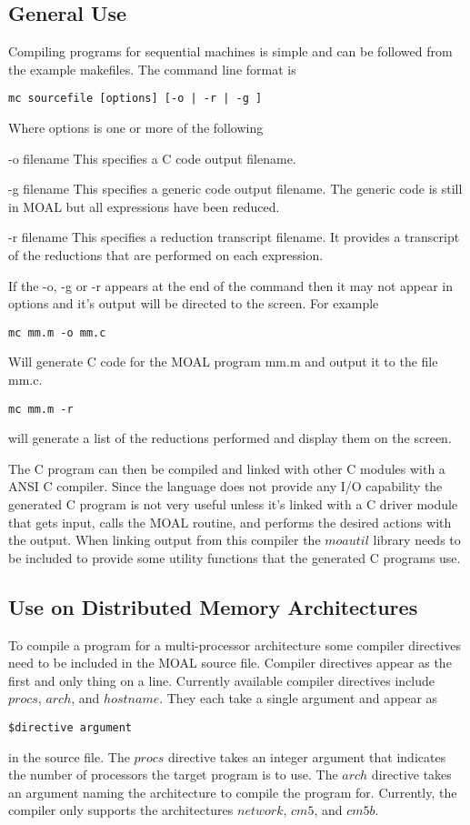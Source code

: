 \subsection{General Use}
\label{using}
  Compiling programs for sequential machines is simple and can be followed 
from the example makefiles.  The command line format is
\begin{verbatim}
mc sourcefile [options] [-o | -r | -g ]
\end{verbatim}
Where options is one or more of the following
\begin{list}{}{}
\item[-o filename] This specifies a C code output filename.
\item[-g filename] This specifies a generic code output filename.  The generic
code is still in MOAL but all expressions have been reduced.
\item[-r filename] This specifies a reduction transcript filename.  It provides
a transcript of the reductions that are performed on each expression.
\end{list}
If the -o, -g or -r appears at the end of the command then it may not appear
in options and it's output will be directed to the screen.  For example
\begin{verbatim}
mc mm.m -o mm.c
\end{verbatim}
Will generate C code for the MOAL program mm.m and output it to the file
mm.c.
\begin{verbatim}
mc mm.m -r
\end{verbatim}
will generate a list of the reductions performed and display them on
the screen.

The C program can then be compiled and linked with other C modules with
a ANSI C compiler.  Since the language does not provide any I/O capability
the generated C program is not very useful unless it's linked with a
C driver module that gets input, calls the MOAL routine, and performs the
desired actions with the output.  When linking output from this compiler
the $moautil$ library needs to be included to provide some utility functions
that the generated C programs use.

\subsection{Use on Distributed Memory Architectures}
  To compile a program for a multi-processor architecture some compiler 
directives need to be included in the MOAL source file. Compiler directives
appear as the first and only thing on a line.  Currently available 
compiler directives include $procs$, $arch$, and $hostname$.  
They each take a single argument and appear as
\begin{verbatim}
$directive argument
\end{verbatim}
in the source file.  The $procs$ directive takes an integer argument that 
indicates the number of processors the target program is to use.  The $arch$ 
directive takes an argument naming the 
architecture to compile the program for.  Currently, the compiler only 
supports the architectures $network$, $cm5$, and $cm5b$.

